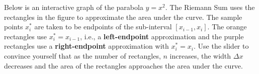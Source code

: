 \documentclass[handout]{ximera}
\begin{document}
\begin{example}[example 6]
Below is an interactive graph of the parabola $y=x^2$.  
The Riemann Sum uses the rectangles in the figure to approximate the area under the curve.
The sample points $x_i^*$ are taken to be endpoints of the sub-interval $[x_{i-1}, x_i]$. 
The orange rectangles use $x_i^* = x_{i-1}$, i.e., 
a \textbf{left-endpoint} approximation and the purple rectangles 
use a \textbf{right-endpoint} approximation with $x_i^* = x_i$.
Use the slider to convince yourself that as the number of rectangles, $n$ increases, the 
width $\Delta x$ decreases and
the area of the rectangles approaches the area under the curve. 
\begin{onlineOnly}
  \begin{center}
  \end{center}
\end{onlineOnly}
\end{example}
\end{document}
